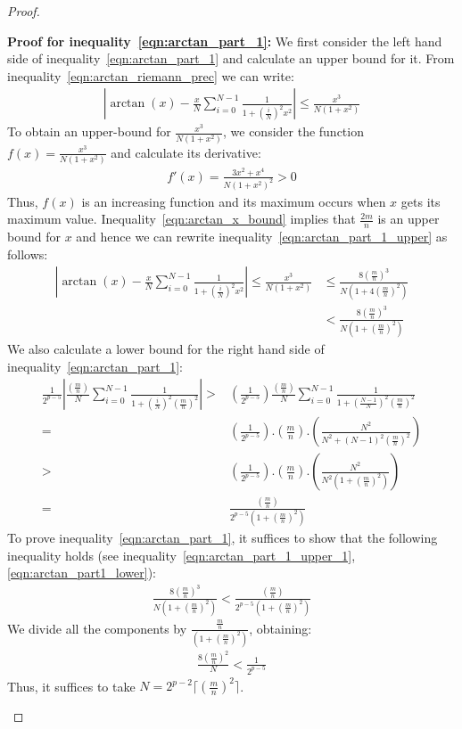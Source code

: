 \documentclass{article}
\numberwithin{mytheorem}{section}
\newcommand{\arctansumu}[2] {\frac{#1}{#2} \sum_{i=0}^{#2-1}\frac{1}{1+(\frac{i}{#2})^2{#1}^2}}
\begin{document}
\begin{proof}
\begin{enumerate}
\textbf{Proof for inequality~\eqref{eqn:arctan_part_1}:}
We first consider the left hand side of inequality~\eqref{eqn:arctan_part_1} and calculate an upper bound for it. From inequality~\eqref{eqn:arctan_riemann_prec} we can write:
\begin{align}
|\arctan(x)-\arctansumu{x}{N}|\leq \frac{x^3}{N(1+x^2)}\label{eqn:arctan_part_1_upper}
\end{align}
To obtain an upper-bound for $\frac{x^3}{N(1+x^2)}$, we consider the function $f(x)=\frac{x^3}{N(1+x^2)}$ and calculate its derivative:
\begin{align*}
f'(x)=\frac{3x^2+x^4}{N(1+x^2)^2}>0
\end{align*}
Thus, $f(x)$ is an increasing function and its maximum occurs when $x$ gets its maximum value. Inequality~\eqref{eqn:arctan_x_bound} implies that $\frac{2m}{n}$ is an upper bound for $x$ and hence we can rewrite inequality~\eqref{eqn:arctan_part_1_upper} as follows:
\begin{align}
|\arctan(x)-\arctansumu{x}{N}|\leq \frac{x^3}{N(1+x^2)}&\leq \frac{8(\frac{m}{n})^3}{N(1+4(\frac{m}{n})^2)}\nonumber\\
&<\frac{8(\frac{m}{n})^3}{N(1+(\frac{m}{n})^2)}\label{eqn:arctan_part_1_upper_1}
\end{align}
We also calculate a lower bound for the right hand side of inequality~\eqref{eqn:arctan_part_1}:
\begin{align}
\frac{1}{2^{p-5}}|\arctansumu{(\frac{m}{n})}{N}|>&(\frac{1}{2^{p-5}})\frac{(\frac{m}{n})}{N}\sum_{i=0}^{N-1}\frac{1}{1+(\frac{N-1}{N})^2(\frac{m}{n})^2}\nonumber\\
=&(\frac{1}{2^{p-5}}).(\frac{m}{n}).(\frac{N^2}{N^2+(N-1)^2(\frac{m}{n})^2})\nonumber\\
>&(\frac{1}{2^{p-5}}).(\frac{m}{n}).(\frac{N^2}{N^2(1+(\frac{m}{n})^2)})\nonumber\\
=&\frac{(\frac{m}{n})}{2^{p-5}(1+(\frac{m}{n})^2)}\label{eqn:arctan_part1_lower}
\end{align}
To prove inequality~\eqref{eqn:arctan_part_1}, it suffices to show that the following inequality holds (see inequality~\eqref{eqn:arctan_part_1_upper_1},\eqref{eqn:arctan_part1_lower}):
\begin{align*}
\frac{8(\frac{m}{n})^3}{N(1+(\frac{m}{n})^2)}<\frac{(\frac{m}{n})}{2^{p-5}(1+(\frac{m}{n})^2)}
\end{align*}
We divide all the components by $\frac{\frac{m}{n}}{(1+(\frac{m}{n})^2)}$, obtaining:
\begin{align*}
\frac{8(\frac{m}{n})^2}{N}<\frac{1}{2^{p-5}}
\end{align*}
Thus, it suffices to take $N= 2^{p-2}\lceil(\frac{m}{n})^2\rceil$.



\end{enumerate}
\end{proof}
\end{document}
